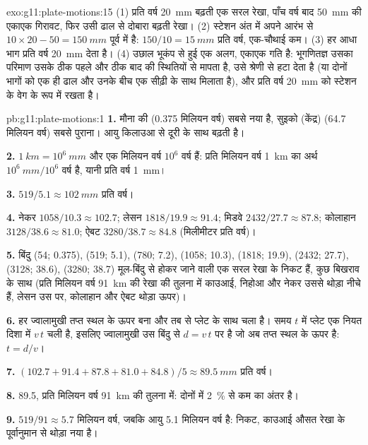 \begin{solution}{exo:g11:plate-motions:15}
(1) प्रति वर्ष \qty{20}{mm} बढ़ती एक सरल रेखा, पाँच वर्ष बाद
\qty{50}{mm} की एकाएक गिरावट, फिर उसी ढाल से दोबारा बढ़ती रेखा।
(2) स्टेशन अंत में अपने आरंभ से $10 \times 20 - 50 = \qty{150}{mm}$ पूर्व में है:
$150/10 = \qty{15}{mm}$ प्रति वर्ष, एक-चौथाई कम। (3) हर आधा भाग
प्रति वर्ष \qty{20}{mm} देता है। (4) उछाल भूकंप से हुई एक अलग, एकाएक
गति है: भूगणितज्ञ उसका परिमाण उसके ठीक पहले और
ठीक बाद की स्थितियों से मापता है, उसे श्रेणी से हटा देता है (या दोनों भागों को
एक ही ढाल और उनके बीच एक सीढ़ी के साथ मिलाता है), और प्रति वर्ष \qty{20}{mm} को
स्टेशन के वेग के रूप में रखता है।
\end{solution}

\begin{solution}{pb:g11:plate-motions:1}
\textbf{1.} मौना की (\num{0.375} मिलियन वर्ष) सबसे नया है, सुइको
(केंद्र) (\num{64.7} मिलियन वर्ष) सबसे पुराना। आयु
किलाउआ से दूरी के साथ बढ़ती है।

\textbf{2.} $\qty{1}{km} = 10^6~\unit{mm}$ और एक मिलियन वर्ष $10^6$
वर्ष हैं: प्रति मिलियन वर्ष \qty{1}{km} का अर्थ $10^6~\unit{mm}/10^6$ वर्ष है,
यानी प्रति वर्ष \qty{1}{mm}।

\textbf{3.} $519/5.1 \approx \qty{102}{mm}$ प्रति वर्ष।

\textbf{4.} नेकर $1058/10.3 \approx 102.7$; लेसन $1818/19.9 \approx
91.4$; मिडवे $2432/27.7 \approx 87.8$; कोलाहान $3128/38.6 \approx 81.0$;
ऐबट $3280/38.7 \approx 84.8$ (मिलीमीटर प्रति वर्ष)।

\textbf{5.} बिंदु (54; 0.375), (519; 5.1), (780; 7.2), (1058; 10.3),
(1818; 19.9), (2432; 27.7), (3128; 38.6), (3280; 38.7) मूल-बिंदु से होकर जाने वाली
एक सरल रेखा के निकट हैं, कुछ बिखराव के साथ (प्रति मिलियन वर्ष \qty{91}{km} की
रेखा की तुलना में काउआई, निहोआ और नेकर उससे थोड़ा नीचे हैं, लेसन उस पर,
कोलाहान और ऐबट थोड़ा ऊपर)।

\textbf{6.} हर ज्वालामुखी तप्त स्थल के ऊपर बना और तब से
प्लेट के साथ चला है। समय $t$ में प्लेट एक नियत
दिशा में $v\,t$ चली है, इसलिए ज्वालामुखी उस बिंदु से $d = v\,t$ पर है जो अब
तप्त स्थल के ऊपर है: $t = d/v$।

\textbf{7.} $(102.7 + 91.4 + 87.8 + 81.0 + 84.8)/5 \approx \qty{89.5}{mm}$ प्रति
वर्ष।

\textbf{8.} 89.5, प्रति मिलियन वर्ष \qty{91}{km} की तुलना में: दोनों में
\qty{2}{\percent} से कम का अंतर है।

\textbf{9.} $519/91 \approx 5.7$ मिलियन वर्ष, जबकि आयु \num{5.1}
मिलियन वर्ष है: निकट, काउआई औसत रेखा के पूर्वानुमान से थोड़ा
नया है।


\end{solution}
